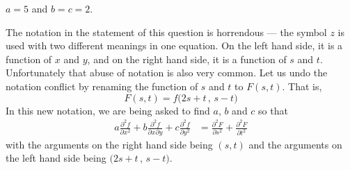 \begin{answer}
$a=5$ and $b=c=2$.
\end{answer}

\begin{solution}
The notation in the statement of this question is horrendous --- 
the symbol $z$ is used with two different meanings in one equation.
On the left hand side, it is a function of $x$ and $y$, 
and on the right hand side, it is a function of $s$ and $t$.  
Unfortunately that abuse of notation is also very common. 
Let us undo the notation conflict by renaming the function of $s$ and $t$ 
to $F(s,t)$. That is,
\begin{equation*}
F(s,t) = f\big(2s+t\,,\,s-t\big)
\end{equation*}
In this new notation, we are being asked to find $a$, $b$ and $c$ so that 
\begin{align*}
a\frac{\partial^2 f}{\partial x^2}
 +b\frac{\partial^2 f}{\partial x\partial y}
 +c\frac{\partial^2 f}{\partial y^2}
&=\frac{\partial^2 F}{\partial s^2} + \frac{\partial^2 F}{\partial t^2}
\end{align*}
with the arguments on the right hand side being $(s,t)$ and the
arguments on the left hand side being $\big(2s+t\,,\,s-t\big)$.


\end{solution}

